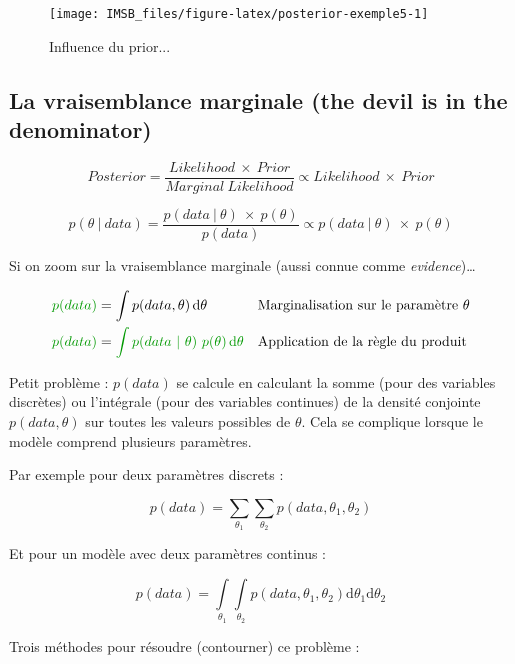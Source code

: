 \documentclass[
  a4paper,11pt,twoside,onecolumn,openright,final,oldfontcommands]{memoir}
\theoremstyle{definition}
\theoremstyle{definition}
\theoremstyle{definition}
\theoremstyle{definition}
\theoremstyle{remark}
\begin{document}
\begin{figure}[!htb]

{\centering \texttt{[image: IMSB\_files/figure-latex/posterior-exemple5-1]} 

}

\caption{Influence du prior...}\label{fig:posterior-exemple5}
\end{figure}

\hypertarget{la-vraisemblance-marginale-the-devil-is-in-the-denominator}{%
\subsection{La vraisemblance marginale (the devil is in the denominator)}\label{la-vraisemblance-marginale-the-devil-is-in-the-denominator}}

\[
Posterior = \frac{Likelihood \ \times \ Prior}{Marginal \ Likelihood} \propto Likelihood \ \times \ Prior
\]

\[
p(\theta \ | \ data) = \frac{p(data \ | \ \theta) \ \times \ p(\theta)}{p(data)} \propto p(data \ | \ \theta) \ \times \ p(\theta)
\]

Si on zoom sur la vraisemblance marginale (aussi connue comme \emph{evidence})\ldots{}

\[
\begin{aligned}
\color{green}{p(data)} &= \int p(data,\theta) \, \mathrm d\theta &&\text{Marginalisation sur le paramètre } \theta \\
\color{green}{p(data)} &= \color{green}{\int p(data \ | \ \theta) \ p(\theta) \, \mathrm{d} \theta} && \text{Application de la règle du produit}
\end{aligned}
\]

Petit problème : \(p(data)\) se calcule en calculant la somme (pour des variables discrètes) ou l'intégrale (pour des variables continues) de la densité conjointe \(p(data, \theta)\) sur toutes les valeurs possibles de \(\theta\). Cela se complique lorsque le modèle comprend plusieurs paramètres.

Par exemple pour deux paramètres discrets :

\[
p(data) = \sum_{\theta_{1}} \sum_{\theta_{2}} p(data, \theta_{1}, \theta_{2})
\]

Et pour un modèle avec deux paramètres continus :

\[
p(data) = \int\limits_{\theta_{1}} \int\limits_{\theta_{2}} p(data, \theta_{1}, \theta_{2}) \mathrm{d} \theta_{1} \mathrm{d} \theta_{2}
\]

Trois méthodes pour résoudre (contourner) ce problème :
\end{document}
